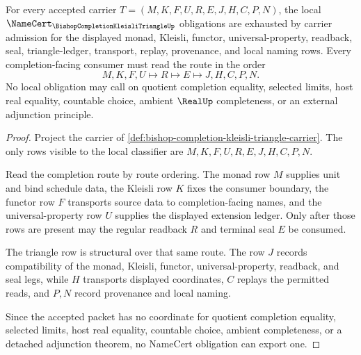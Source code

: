 \begin{theorem}
\label{thm:bishop-completion-kleisli-triangle-obligations}
For every accepted carrier $T=(M,K,F,U,R,E,J,H,C,P,N)$, the local $\NameCert_{\BishopCompletionKleisliTriangleUp}$ obligations are exhausted by carrier admission for the displayed monad, Kleisli, functor, universal-property, readback, seal, triangle-ledger, transport, replay, provenance, and local naming rows. Every completion-facing consumer must read the route in the order
$$
M,K,F,U \longmapsto R \longmapsto E \longmapsto J,H,C,P,N .
$$
No local obligation may call on quotient completion equality, selected limits, host real equality, countable choice, ambient $\RealUp$ completeness, or an external adjunction principle.
\end{theorem}
\begin{proof}
Project the carrier of \autoref{def:bishop-completion-kleisli-triangle-carrier}. The only rows visible to the local classifier are $M,K,F,U,R,E,J,H,C,P,N$.

Read the completion route by route ordering. The monad row $M$ supplies unit and bind schedule data, the Kleisli row $K$ fixes the consumer boundary, the functor row $F$ transports source data to completion-facing names, and the universal-property row $U$ supplies the displayed extension ledger. Only after those rows are present may the regular readback $R$ and terminal seal $E$ be consumed.

The triangle row is structural over that same route. The row $J$ records compatibility of the monad, Kleisli, functor, universal-property, readback, and seal legs, while $H$ transports displayed coordinates, $C$ replays the permitted reads, and $P,N$ record provenance and local naming.

Since the accepted packet has no coordinate for quotient completion equality, selected limits, host real equality, countable choice, ambient completeness, or a detached adjunction theorem, no NameCert obligation can export one.
\end{proof}

